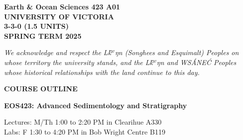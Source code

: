 \documentclass[11pt]{article}
\def\schwa{{\tenipa\char64}}
\begin{document}

%


\hspace*{\fill}\textbf{Earth \& Ocean Sciences 423 A01}\\
\hspace*{\fill}\textbf{UNIVERSITY OF VICTORIA}\\
\hspace*{\fill}\textbf{3-3-0 (1.5 UNITS)}\\
\hspace*{\fill}\textbf{SPRING TERM 2025}\\


\noindent\hrulefill

\begin{center}
\emph{We acknowledge and respect the L\schwa\'k$^w$\schwa ŋ\schwa n (Songhees and Esquimalt) Peoples on whose territory the university stands, and the L\schwa\'k$^w$\schwa ŋ\schwa n and WS\'ANE\'C Peoples whose historical relationships with the land continue to this day.}
\end{center}

\noindent\hrulefill

\begin{center}
\Large \textbf{COURSE OUTLINE}

\Large \textbf{EOS423: Advanced Sedimentology and Stratigraphy}

\normalsize Lectures: M/Th 1:00 to 2:20 PM in Clearihue A330 \\
\normalsize Labs: F 1:30 to 4:20 PM in Bob Wright Centre B119 \\
\end{center}

\noindent\hrulefill
\end{document}
